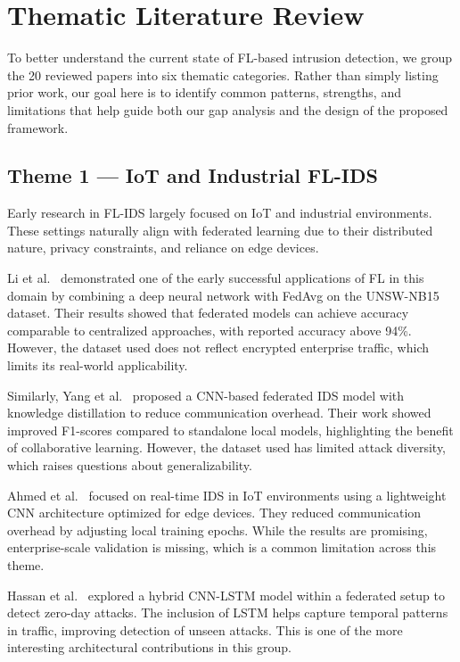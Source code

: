 \documentclass[conference]{IEEEtran}
\begin{document}
\section{Thematic Literature Review}
\label{sec:literature}

To better understand the current state of FL-based intrusion detection, we group the 20 reviewed papers into six thematic categories. Rather than simply listing prior work, our goal here is to identify common patterns, strengths, and limitations that help guide both our gap analysis and the design of the proposed framework.

\subsection{Theme 1 --- IoT and Industrial FL-IDS}

Early research in FL-IDS largely focused on IoT and industrial environments. These settings naturally align with federated learning due to their distributed nature, privacy constraints, and reliance on edge devices.

Li et al.~\cite{li2022} demonstrated one of the early successful applications of FL in this domain by combining a deep neural network with FedAvg on the UNSW-NB15 dataset. Their results showed that federated models can achieve accuracy comparable to centralized approaches, with reported accuracy above 94\%. However, the dataset used does not reflect encrypted enterprise traffic, which limits its real-world applicability.

Similarly, Yang et al.~\cite{yang2022} proposed a CNN-based federated IDS model with knowledge distillation to reduce communication overhead. Their work showed improved F1-scores compared to standalone local models, highlighting the benefit of collaborative learning. However, the dataset used has limited attack diversity, which raises questions about generalizability.

Ahmed et al.~\cite{ahmed2024} focused on real-time IDS in IoT environments using a lightweight CNN architecture optimized for edge devices. They reduced communication overhead by adjusting local training epochs. While the results are promising, enterprise-scale validation is missing, which is a common limitation across this theme.

Hassan et al.~\cite{hassan2021} explored a hybrid CNN-LSTM model within a federated setup to detect zero-day attacks. The inclusion of LSTM helps capture temporal patterns in traffic, improving detection of unseen attacks. This is one of the more interesting architectural contributions in this group.
\end{document}
